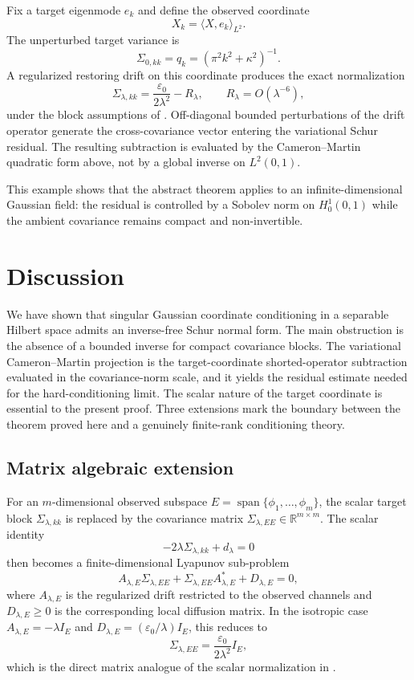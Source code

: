 \documentclass[11pt]{amsart}
\theoremstyle{plain}
\theoremstyle{definition}
\theoremstyle{remark}
\begin{document}
Fix a target eigenmode $e_k$ and define the observed coordinate
\[
  X_k=\langle X,e_k\rangle_{L^2}.
\]
The unperturbed target variance is
\[
  \Sigma_{0,kk}=q_k=(\pi^2k^2+\kappa^2)^{-1}.
\]
A regularized restoring drift on this coordinate produces the exact normalization
\[
  \Sigma_{\lambda,kk}=\frac{\varepsilon_0}{2\lambda^2}-R_\lambda,
  \qquad R_\lambda=O(\lambda^{-6}),
\]
under the block assumptions of . Off-diagonal bounded perturbations of the drift operator generate the cross-covariance vector entering the variational Schur residual. The resulting subtraction is evaluated by the Cameron--Martin quadratic form above, not by a global inverse on $L^2(0,1)$.

This example shows that the abstract theorem applies to an infinite-dimensional Gaussian field: the residual is controlled by a Sobolev norm on $H_0^1(0,1)$ while the ambient covariance remains compact and non-invertible.

\section{Discussion}
\label{sec:discussion}

We have shown that singular Gaussian coordinate conditioning in a separable Hilbert space admits an inverse-free Schur normal form.  The main obstruction is the absence of a bounded inverse for compact covariance blocks.  The variational Cameron--Martin projection is the target-coordinate shorted-operator subtraction evaluated in the covariance-norm scale, and it yields the residual estimate needed for the hard-conditioning limit.  The scalar nature of the target coordinate is essential to the present proof.  Three extensions mark the boundary between the theorem proved here and a genuinely finite-rank conditioning theory.

\subsection{Matrix algebraic extension}
\label{sec:discussion:matrix-extension}

For an $m$-dimensional observed subspace $E=\operatorname{span}\{\phi_1,\ldots,\phi_m\}$, the scalar target block $\Sigma_{\lambda,kk}$ is replaced by the covariance matrix $\Sigma_{\lambda,EE}\in\mathbb{R}^{m\times m}$.  The scalar identity
\[
  -2\lambda\Sigma_{\lambda,kk}+d_\lambda=0
\]
then becomes a finite-dimensional Lyapunov sub-problem
\begin{equation}
  \label{eq:discussion_matrix_lyapunov}
  A_{\lambda,E}\Sigma_{\lambda,EE}
  +\Sigma_{\lambda,EE}A_{\lambda,E}^{*}
  +D_{\lambda,E}=0,
\end{equation}
where $A_{\lambda,E}$ is the regularized drift restricted to the observed channels and $D_{\lambda,E}\ge0$ is the corresponding local diffusion matrix.  In the isotropic case $A_{\lambda,E}=-\lambda I_E$ and $D_{\lambda,E}=(\varepsilon_0/\lambda)I_E$, this reduces to
\[
  \Sigma_{\lambda,EE}=\frac{\varepsilon_0}{2\lambda^2}I_E,
\]
which is the direct matrix analogue of the scalar normalization in .
\end{document}

